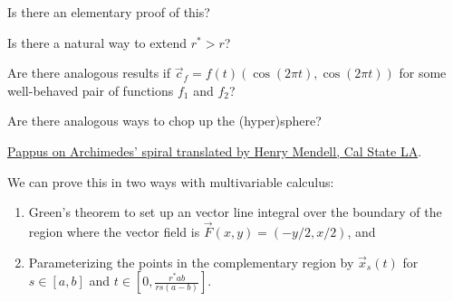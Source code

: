\documentclass{article}
\begin{document}
\begin{question}
  Is there an elementary proof of this?
\end{question}

\begin{related}
  \item Is there a natural way to extend $r^* > r$?
  \item Are there analogous results if $\vec{c}_f = f(t)\left(\cos(2\pi t), \cos(2\pi t)\right)$
  for some well-behaved pair of functions $f_1$ and $f_2$?
  \item Are there analogous ways to chop up the (hyper)sphere?
\end{related}

\begin{references}
  \item \href{https://web.calstatela.edu/faculty/hmendel/Ancient%20Mathematics/Pappus/Bookiv/Pappus.iv.21-25/Pappus.iv.21_25.html#Prop.%2023}{Pappus on Archimedes' spiral translated by Henry Mendell, Cal State LA}.
\end{references}
\begin{note}
  We can prove this in two ways with multivariable calculus: \begin{enumerate}
    \item Green's theorem to set up an vector line integral over the
    boundary of the region where the vector field is
    \(\vec{F}(x, y) = (-y/2, x/2)\), and
    \item Parameterizing the points in the complementary region by
    \(\vec{x}_s(t)\) for $s \in [a, b]$ and
    $\displaystyle t \in \left[0, \frac{r^*ab}{rs(a-b)}\right]$.
  \end{enumerate}
\end{note}
\end{document}
